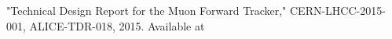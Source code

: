 "Technical Design Report for the Muon Forward Tracker," CERN-LHCC-2015-001, ALICE-TDR-018, 2015. Available at
